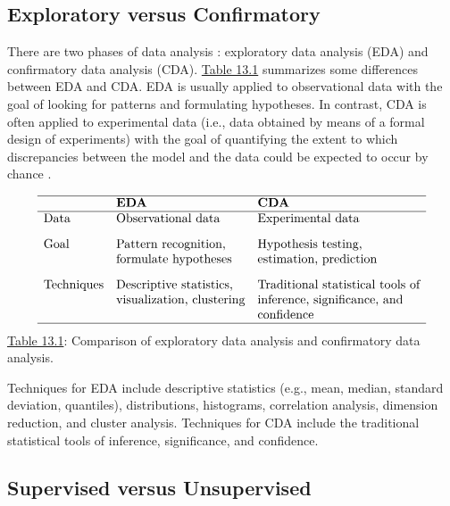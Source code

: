 \documentclass[]{book}
\theoremstyle{definition}
\theoremstyle{definition}
\theoremstyle{definition}
\theoremstyle{remark}
\begin{document}
\subsection{Exploratory versus
Confirmatory}\label{exploratory-versus-confirmatory}

There are two phases of data analysis \citep{good1983data}: exploratory
data analysis (EDA) and confirmatory data analysis (CDA).
\protect\hyperlink{tab:13.1}{Table 13.1} summarizes some differences
between EDA and CDA. EDA is usually applied to observational data with
the goal of looking for patterns and formulating hypotheses. In
contrast, CDA is often applied to experimental data (i.e., data obtained
by means of a formal design of experiments) with the goal of quantifying
the extent to which discrepancies between the model and the data could
be expected to occur by chance \citep{gelman2004eda}.

\[\begin{matrix}
\begin{array}{lll} \hline
 & \textbf{EDA} & \textbf{CDA} \\\hline
\text{Data} & \text{Observational data} & \text{Experimental data}\\[3mm]
\text{Goal} & \text{Pattern recognition,}  & \text{Hypothesis testing,}  \\
& \text{formulate hypotheses} & \text{estimation, prediction} \\[3mm]
\text{Techniques} & \text{Descriptive statistics,} & \text{Traditional statistical tools of} \\
& \text{visualization, clustering} & \text{inference, significance, and}\\
& & \text{confidence} \\
\hline
\end{array}
\end{matrix}
\] \protect\hyperlink{tab:13.1}{Table 13.1}: Comparison of exploratory
data analysis and confirmatory data analysis.

Techniques for EDA include descriptive statistics (e.g., mean, median,
standard deviation, quantiles), distributions, histograms, correlation
analysis, dimension reduction, and cluster analysis. Techniques for CDA
include the traditional statistical tools of inference, significance,
and confidence.

\subsection{Supervised versus
Unsupervised}\label{supervised-versus-unsupervised}
\end{document}
